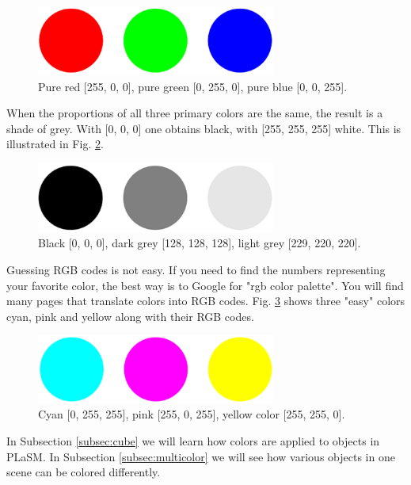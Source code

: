 \begin{figure}[!ht]
\begin{center}
\includegraphics[width=0.7\textwidth]{img/rgb.png}
\end{center}
\vspace{-4mm}
\caption{Pure red [255, 0, 0], pure green [0, 255, 0], pure blue [0, 0, 255].}
\vspace{-4mm}
\label{fig:rgb}
\end{figure}
\noindent
When the proportions of all three primary colors are the same, the result is a shade of grey.
With [0, 0, 0] one obtains black, with [255, 255, 255] white. This is illustrated in Fig. \ref{fig:rgb2}.\\[-7mm]

\begin{figure}[!ht]
\begin{center}
\includegraphics[width=0.7\textwidth]{img/rgb2.png}
\end{center}
\vspace{-4mm}
\caption{Black [0, 0, 0], dark grey [128, 128, 128], light grey [229, 220, 220].}
\vspace{-4mm}
\label{fig:rgb2}
\end{figure}
\noindent
\noindent
Guessing RGB codes is not easy. If you need to find the numbers representing your favorite color, 
the best way is to Google for "rgb color palette". You will find many pages that translate
colors into RGB codes. Fig. \ref{fig:rgb3} shows three "easy" colors
cyan, pink and yellow along with their RGB codes.\\[-7mm]

\begin{figure}[!ht]
\begin{center}
\includegraphics[width=0.7\textwidth]{img/rgb3.png}
\end{center}
\vspace{-4mm}
\caption{Cyan [0, 255, 255], pink [255, 0, 255], yellow color [255, 255, 0].}
\vspace{-4mm}
\label{fig:rgb3}
\end{figure}
\noindent
In Subsection \ref{subsec:cube} we will learn how colors are applied to 
objects in PLaSM. 
In Subsection \ref{subsec:multicolor} we will see how various objects in
one scene can be colored differently.

